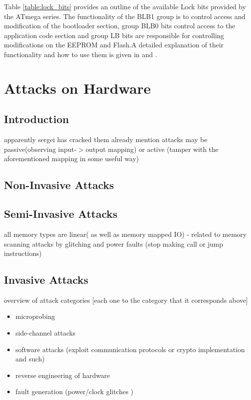 \documentclass[12pt,a4paper,twocolumn]{article}
\begin{document}
Table \ref{table:lock_bits}	 provides an outline of the available Lock bits provided by the ATmega series. The functionality of the BLB1 group is to control access and modification of the bootloader section, group BLB0 bits control access to the application code section and group LB bits are responsible for controlling modifications on the EEPROM and Flash.A detailed explanation of their functionality and how to use them is given in \citep{atmega1284_manual} and \citep{atmega644_manual}.
	
\section{Attacks on Hardware}
\label{sec:curr_attacks}
	\subsection{Introduction}
		apparently sergei has cracked them already \cite{website:scorobogatov_breaking_copy_protection}
	mention attacks may be passive(observing input-$>$output mapping) or active (tamper with the aforementioned mapping in some useful way)
	\subsection{Non-Invasive Attacks}
	\subsection{Semi-Invasive Attacks}
		all memory types are linear( as well as memory mapped IO) - related to memory scanning attacks by glitching and power faults (stop making call or jump instructions)
	\subsection{Invasive Attacks}

	overview of attack categories [each one to the category that it corresponds above]
	\begin{itemize}
		\item microprobing \\
		\item side-channel attacks \\
		\item software attacks (exploit communication protocols or crypto implementation and such) \\
		\item reverse engineering of hardware\\
		\item fault generation (power/clock glitches ) \\
	\end{itemize}
	
\end{document}
